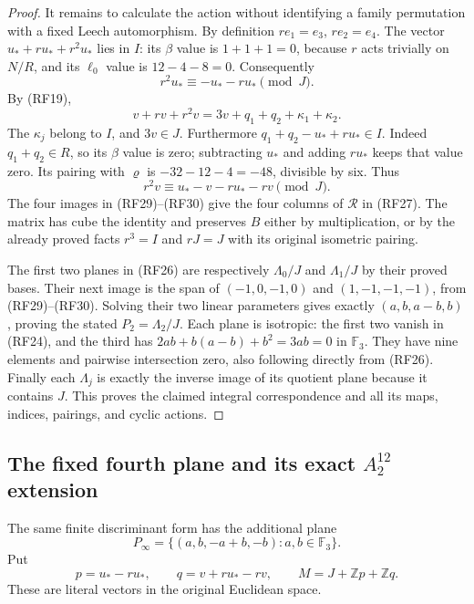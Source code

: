 \begin{proof}
It remains to calculate the action without identifying a
family permutation with a fixed Leech automorphism.
By definition $r e_1=e_3$, $r e_2=e_4$.
The vector $u_*+ru_*+r^2u_*$ lies in $I$: its $\beta$ value
is $1+1+1=0$, because $r$ acts trivially on $N/R$,
and its $\ell_0$ value is $12-4-8=0$.
Consequently
\[
 r^2u_*\equiv-u_*-ru_*\pmod J.
 \tag{RF29}
\]
By (RF19),
\[
 v+rv+r^2v
       =3v+q_1+q_2+\kappa_1+\kappa_2.
\]
The $\kappa_j$ belong to $I$, and $3v\in J$.
Furthermore $q_1+q_2-u_*+ru_*\in I$.
Indeed $q_1+q_2\in R$, so its $\beta$ value is zero;
subtracting $u_*$ and adding $ru_*$ keeps that value zero.
Its pairing with $\varrho$ is
$-32-12-4=-48$, divisible by six.
Thus
\[
 r^2v\equiv u_*-v-ru_*-rv\pmod J.
 \tag{RF30}
\]
The four images in (RF29)--(RF30) give the four columns of
$\mathcal R$ in (RF27).
The matrix has cube the identity and preserves $B$ either
by multiplication, or by the already proved facts $r^3=I$
and $rJ=J$ with its original isometric pairing.

The first two planes in (RF26) are respectively
$\Lambda_0/J$ and $\Lambda_1/J$ by their proved bases.
Their next image is the span of
$(-1,0,-1,0)$ and $(1,-1,-1,-1)$, from (RF29)--(RF30).
Solving their two linear parameters gives exactly
$(a,b,a-b,b)$, proving the stated $P_2=\Lambda_2/J$.
Each plane is isotropic: the first two vanish in (RF24),
and the third has
$2ab+b(a-b)+b^2=3ab=0$ in $\mathbb F_3$.
They have nine elements and pairwise intersection zero,
also following directly from (RF26).
Finally each $\Lambda_j$ is exactly the inverse image of
its quotient plane because it contains $J$.
This proves the claimed integral correspondence and all
its maps, indices, pairings, and cyclic actions.
\end{proof}

\subsection{The fixed fourth plane and its exact \texorpdfstring{$A_2^{12}$}{A2 to the twelfth power} extension}

The same finite discriminant form has the additional plane
\[
 P_\infty=\{(a,b,-a+b,-b):a,b\in\mathbb F_3\}.
 \tag{RF31}
\]
Put
\[
 p=u_*-ru_*,\qquad q=v+ru_*-rv,\qquad
                       M=J+\mathbb Zp+\mathbb Zq.
 \tag{RF32}
\]
These are literal vectors in the original Euclidean space.

